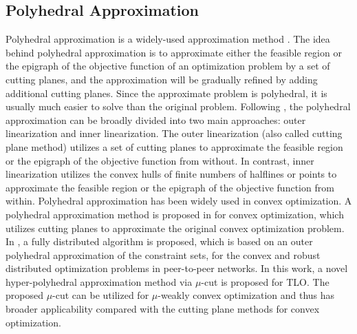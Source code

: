 \documentclass[letterpaper]{article} %
\begin{document}
\subsection{Polyhedral Approximation}
Polyhedral approximation is a widely-used approximation method \cite{bertsekas2015convex}. The idea behind polyhedral approximation is to approximate either the feasible region or the
epigraph of the objective function of an optimization problem by a set of cutting planes, and the approximation will be gradually refined by adding additional cutting planes. Since the approximate problem is polyhedral, it is usually much easier to solve than the original problem. Following \cite{bertsekas2015convex}, the polyhedral approximation can be broadly divided into two main approaches: outer linearization and inner linearization. The outer linearization \cite{tawarmalani2005polyhedral,yang2008distributed,burger2013polyhedral} (also called cutting plane method) utilizes a set of cutting planes to approximate the feasible region or the
epigraph of the objective function from
without. In contrast, inner linearization \cite{bertsekas2011unifying,trombettoni2011inner} utilizes the convex hulls
of finite numbers of halflines or points to approximate the feasible region or the
epigraph of the objective function from within. Polyhedral approximation has been widely used in convex optimization. A polyhedral approximation method is proposed in \cite{bertsekas2015convex} for convex optimization, which utilizes cutting planes to approximate the original convex optimization problem. In \cite{burger2013polyhedral}, a fully distributed
algorithm is proposed, which is based on an outer polyhedral approximation of
the constraint sets, for the convex and robust distributed optimization
problems in peer-to-peer networks.  In this work, a novel hyper-polyhedral approximation method via $\mu$-cut is proposed for TLO. The proposed $\mu$-cut can be utilized for $\mu$-weakly convex optimization and thus has broader applicability compared with the cutting plane methods for convex optimization.
\end{document}
